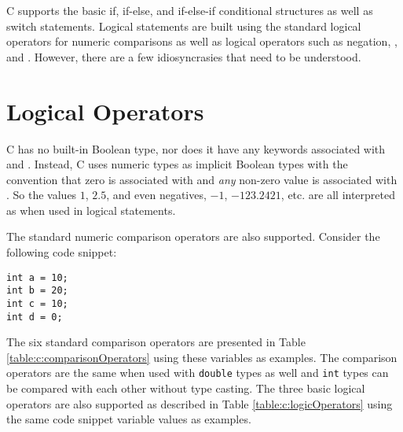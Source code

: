 

C supports the basic if, if-else, and if-else-if conditional structures as well as switch
statements.  Logical statements are built using the standard logical operators for
numeric comparisons as well as logical operators such as negation, \And, and 
\Or.  However, there are a few idiosyncrasies that need to be understood.

\section{Logical Operators}

C has no built-in Boolean type, nor does it have any keywords 
associated with \True and \False.  Instead, C uses numeric types as implicit 
Boolean types with the convention that zero is associated with \False and 
\emph{any} non-zero value is associated with \True.  So the values $1$, $2.5$, 
and even negatives, $-1$, $-123.2421$, etc. are all interpreted as \True when
used in logical statements.  

The standard numeric comparison operators are also supported.  Consider the 
following code snippet:

\begin{verbatim}
int a = 10;
int b = 20;
int c = 10;
int d = 0;
\end{verbatim}

The six standard comparison operators are presented in Table \ref{table:c:comparisonOperators}
using these variables as examples.  The comparison operators are the same when
used with \texttt{double} types as well and \texttt{int} types 
can be compared with each other without type casting. The three basic logical operators are also supported as described in 
Table \ref{table:c:logicOperators} using the same code snippet variable
values as examples.



